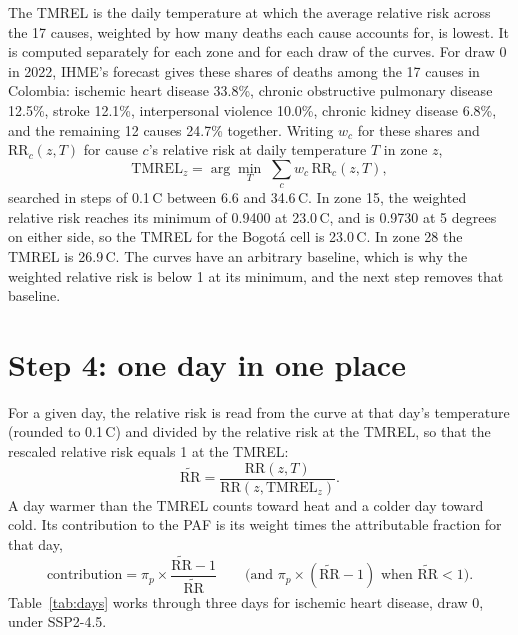 \documentclass[11pt]{ozreport}
\begin{document}
The TMREL is the daily temperature at which the average relative risk across the 17 causes, weighted by how many deaths each cause accounts for, is lowest. It is computed separately for each zone and for each draw of the curves. For draw 0 in 2022, IHME's forecast gives these shares of deaths among the 17 causes in Colombia: ischemic heart disease 33.8\%, chronic obstructive pulmonary disease 12.5\%, stroke 12.1\%, interpersonal violence 10.0\%, chronic kidney disease 6.8\%, and the remaining 12 causes 24.7\% together. Writing $w_c$ for these shares and $\mathrm{RR}_c(z, T)$ for cause $c$'s relative risk at daily temperature $T$ in zone $z$,
\begin{equation}
  \mathrm{TMREL}_z = \arg\min_{T} \; \sum_{c} w_c \, \mathrm{RR}_c(z, T),
\end{equation}
searched in steps of 0.1\,\textdegree C between 6.6 and 34.6\,\textdegree C. In zone 15, the weighted relative risk reaches its minimum of 0.9400 at 23.0\,\textdegree C, and is 0.9730 at 5 degrees on either side, so the TMREL for the Bogotá cell is 23.0\,\textdegree C. In zone 28 the TMREL is 26.9\,\textdegree C. The curves have an arbitrary baseline, which is why the weighted relative risk is below 1 at its minimum, and the next step removes that baseline.

\section{Step 4: one day in one place}

For a given day, the relative risk is read from the curve at that day's temperature (rounded to 0.1\,\textdegree C) and divided by the relative risk at the TMREL, so that the rescaled relative risk equals 1 at the TMREL:
\begin{equation}
  \widetilde{\mathrm{RR}} = \frac{\mathrm{RR}(z, T)}{\mathrm{RR}(z, \mathrm{TMREL}_z)}.
\end{equation}
A day warmer than the TMREL counts toward heat and a colder day toward cold. Its contribution to the PAF is its weight times the attributable fraction for that day,
\begin{equation}
  \text{contribution} = \pi_p \times \frac{\widetilde{\mathrm{RR}} - 1}{\widetilde{\mathrm{RR}}}
  \qquad \text{(and } \pi_p \times (\widetilde{\mathrm{RR}} - 1) \text{ when } \widetilde{\mathrm{RR}} < 1\text{)}.
\end{equation}
Table~\ref{tab:days} works through three days for ischemic heart disease, draw 0, under SSP2-4.5.
\end{document}
